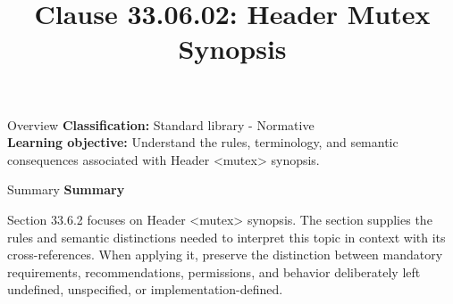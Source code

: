 \documentclass[10pt,letterpaper]{article}
\title{Clause 33.06.02: Header Mutex Synopsis}
\author{}
\date{}
\begin{document}
\maketitle
\begin{CornellOverviewBox}{Overview}
\textbf{Classification:} Standard library - Normative\\[2pt]
\textbf{Learning objective:} Understand the rules, terminology, and semantic consequences associated with Header <mutex> synopsis.
\end{CornellOverviewBox}\begin{CornellSummaryBox}{Summary}
{\sffamily\bfseries\color{Accent} Summary}\par\vspace{3pt}Section 33.6.2 focuses on Header <mutex> synopsis. The section supplies the rules and semantic distinctions needed to interpret this topic in context with its cross-references. When applying it, preserve the distinction between mandatory requirements, recommendations, permissions, and behavior deliberately left undefined, unspecified, or implementation-defined.
\end{CornellSummaryBox}
\end{document}
